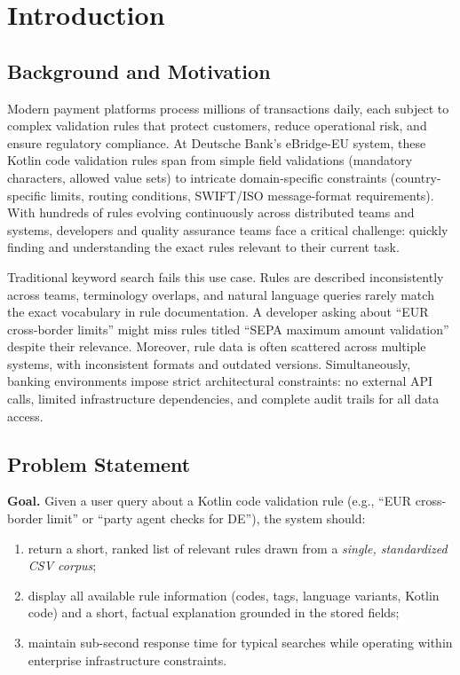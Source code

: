 \chapter{Introduction}
\label{ch:introduction}

\section{Background and Motivation}
Modern payment platforms process millions of transactions daily, each subject to complex validation rules that protect customers, reduce operational risk, and ensure regulatory compliance. At Deutsche Bank's eBridge-EU system, these Kotlin code validation rules span from simple field validations (mandatory characters, allowed value sets) to intricate domain-specific constraints (country-specific limits, routing conditions, SWIFT/ISO message-format requirements). With hundreds of rules evolving continuously across distributed teams and systems, developers and quality assurance teams face a critical challenge: quickly finding and understanding the exact rules relevant to their current task.

Traditional keyword search fails this use case. Rules are described inconsistently across teams, terminology overlaps, and natural language queries rarely match the exact vocabulary in rule documentation. A developer asking about ``EUR cross-border limits'' might miss rules titled ``SEPA maximum amount validation'' despite their relevance. Moreover, rule data is often scattered across multiple systems, with inconsistent formats and outdated versions. Simultaneously, banking environments impose strict architectural constraints: no external API calls, limited infrastructure dependencies, and complete audit trails for all data access.

\section{Problem Statement}
\textbf{Goal.} Given a user query about a Kotlin code validation rule (e.g., ``EUR cross-border limit'' or ``party agent checks for DE''), the system should:
\begin{enumerate}[leftmargin=*,itemsep=2pt,topsep=2pt]
 \item return a short, ranked list of relevant rules drawn from a \emph{single, standardized CSV corpus};
 \item display all available rule information (codes, tags, language variants, Kotlin code) and a short, factual explanation grounded in the stored fields;
 \item maintain sub-second response time for typical searches while operating within enterprise infrastructure constraints.
\end{enumerate}

